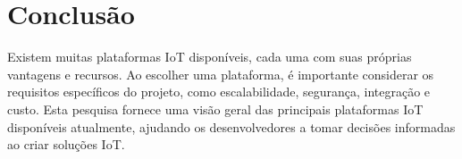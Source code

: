 \documentclass{ufersa}
\begin{document}
\section{Conclusão}
Existem muitas plataformas IoT disponíveis, cada uma com suas próprias vantagens e recursos. Ao escolher uma plataforma, é importante considerar os requisitos específicos do projeto, como escalabilidade, segurança, integração e custo. Esta pesquisa fornece uma visão geral das principais plataformas IoT disponíveis atualmente, ajudando os desenvolvedores a tomar decisões informadas ao criar soluções IoT.
\end{document}
